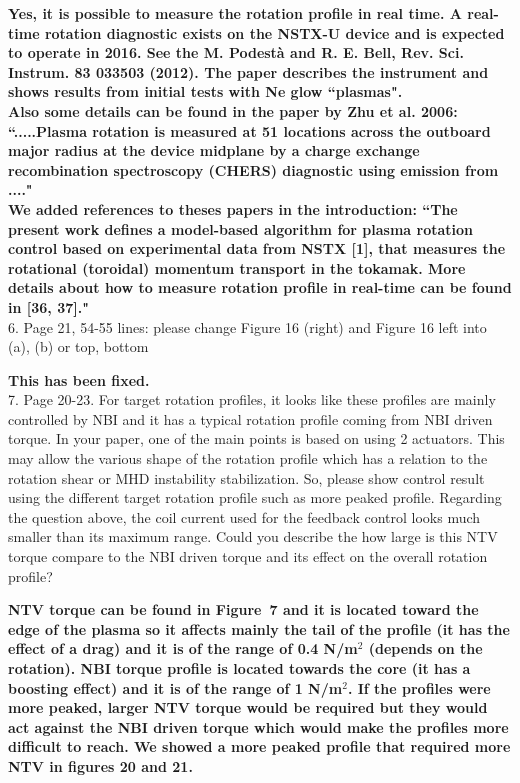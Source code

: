 \documentclass{scrartcl}
\newcommand{\response}[1]{\textcolor{red!80!black}{\bf #1}}
\begin{document}
\response{Yes, it is possible to measure the rotation profile in real time.
A real-time rotation diagnostic exists on the NSTX-U device and is expected to operate in 2016.
See the
M. Podest\`a and R. E. Bell, Rev. Sci. Instrum. 83 033503 (2012).
The paper describes the instrument and shows results from initial tests with Ne glow ``plasmas".\\
Also some details can be found in the paper by Zhu et al. 2006:
``.....Plasma rotation is measured at 51 locations across the outboard major radius at the device midplane by a charge exchange recombination spectroscopy (CHERS) diagnostic using emission from ...."\\
We added references to theses papers in the introduction:
``The present work defines a model-based algorithm for plasma rotation control based on experimental data from NSTX [1], that measures the rotational (toroidal) momentum transport in the tokamak. More details about how to measure rotation profile in real-time can be found in [36, 37]."} \\

6. Page 21, 54-55 lines: please change Figure 16 (right) and Figure 16 left into (a), (b) or top, bottom

\response{This has been fixed.}\\

7. Page 20-23.
For target rotation profiles, it looks like these profiles are mainly controlled by NBI and it has a typical rotation profile coming from NBI driven torque. In your paper, one of the main points is based on using 2 actuators. This may allow the various shape of the rotation profile which has a relation to the rotation shear or MHD instability stabilization. So, please show control result using the different target rotation profile such as more peaked profile.
Regarding the question above, the coil current used for the feedback control looks much smaller than its maximum range. Could you describe the how large is this NTV torque compare to the NBI driven torque and its effect on the overall rotation profile?

\response{NTV torque can be found in Figure~7 and it is located toward the edge of the plasma so it affects mainly the tail of the profile (it has the effect of a drag) and it is of the range of 0.4 N/m$^2$ (depends on the rotation).
NBI torque profile is located towards the core (it has a boosting effect) and it is of the range of 1 N/m$^2$.
If the profiles were more peaked, larger NTV torque would be required but they would act against the NBI driven torque which would make the profiles more difficult to reach.
We showed a more peaked profile that required more NTV in figures 20 and 21.}
\end{document}
